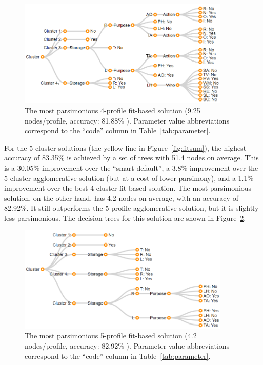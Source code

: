 \begin{figure}
	\centering
	\includegraphics[width=0.9\textwidth]{figures/fit_4_profile010.png}
	\caption{The most parsimonious 4-profile fit-based solution (9.25 nodes/profile, accuracy: 81.88\% ). Parameter value abbreviations correspond to the ``code'' column in Table~\ref{tab:parameter}.}
	\label{fig:fit_4_profile010}
	\vspace{20px}
\end{figure}

For the 5-cluster solutions (the yellow line in Figure~\ref{fig:fitsum}), the highest accuracy of 83.35\% is achieved by a set of trees with 51.4 nodes on average. This is a 30.05\% improvement over the ``smart default'', a 3.8\% improvement over the 5-cluster agglomerative solution (but at a cost of lower parsimony), and a 1.1\% improvement over the best 4-cluster fit-based solution. The most parsimonious solution, on the other hand, has 4.2 nodes on average, with an accuracy of 82.92\%. It still outperforms the 5-profile agglomerative solution, but it is slightly less parsimonious. The decision trees for this solution are shown in Figure~\ref{fig:fit_5_profile001}.

\begin{figure}
	\centering
	\includegraphics[width=0.9\textwidth]{figures/fit_5_profile001.png}
	\caption{The most parsimonious 5-profile fit-based solution (4.2 nodes/profile, accuracy: 82.92\% ). Parameter value abbreviations correspond to the ``code'' column in Table~\ref{tab:parameter}.}
	\label{fig:fit_5_profile001}
\end{figure}

